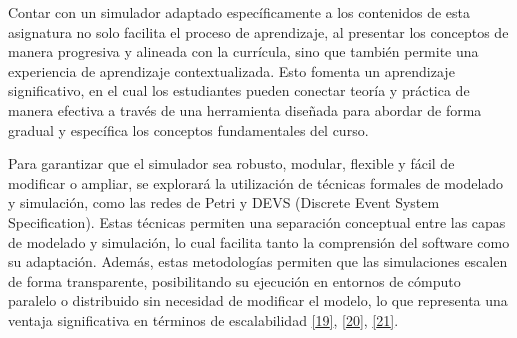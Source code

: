 \documentclass[12pt,oneside]{templates/unerthesis}
\begin{document}
\begin{table}[!h]
\centering
\caption{\label{tab:funcionalidadessimulador}Funcionalidades principales del simulador propuesto}
\centering
{}
\end{table}

Contar con un simulador adaptado específicamente a los contenidos de esta asignatura no solo facilita el proceso de aprendizaje, al presentar los conceptos de manera progresiva y alineada con la currícula, sino que también permite una experiencia de aprendizaje contextualizada. Esto fomenta un aprendizaje significativo, en el cual los estudiantes pueden conectar teoría y práctica de manera efectiva a través de una herramienta diseñada para abordar de forma gradual y específica los conceptos fundamentales del curso.

Para garantizar que el simulador sea robusto, modular, flexible y fácil de modificar o ampliar, se explorará la utilización de técnicas formales de modelado y simulación, como las redes de Petri y DEVS (Discrete Event System Specification). Estas técnicas permiten una separación conceptual entre las capas de modelado y simulación, lo cual facilita tanto la comprensión del software como su adaptación. Además, estas metodologías permiten que las simulaciones escalen de forma transparente, posibilitando su ejecución en entornos de cómputo paralelo o distribuido sin necesidad de modificar el modelo, lo que representa una ventaja significativa en términos de escalabilidad \protect\hyperlink{ref-peterson_petri_1981}{{[}19{]}}, \protect\hyperlink{ref-zeigler_theory_2000}{{[}20{]}}, \protect\hyperlink{ref-zeigler_theory_2018}{{[}21{]}}.
\end{document}
